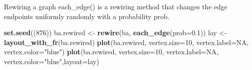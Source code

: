 \documentclass[]{article}
\newenvironment{Shaded}{\begin{snugshade}}{\end{snugshade}}
\newcommand{\DataTypeTok}[1]{\textcolor[rgb]{0.13,0.29,0.53}{#1}}
\newcommand{\DecValTok}[1]{\textcolor[rgb]{0.00,0.00,0.81}{#1}}
\newcommand{\FloatTok}[1]{\textcolor[rgb]{0.00,0.00,0.81}{#1}}
\newcommand{\KeywordTok}[1]{\textcolor[rgb]{0.13,0.29,0.53}{\textbf{#1}}}
\newcommand{\NormalTok}[1]{#1}
\newcommand{\OtherTok}[1]{\textcolor[rgb]{0.56,0.35,0.01}{#1}}
\newcommand{\StringTok}[1]{\textcolor[rgb]{0.31,0.60,0.02}{#1}}
\begin{document}
Rewiring a graph each\_edge() is a rewiring method that changes the edge
endpoints uniformly randomly with a probability prob.

\begin{Shaded}
\begin{Highlighting}[]
\KeywordTok{set.seed}\NormalTok{((}\DecValTok{876}\NormalTok{))}
\NormalTok{ba.rewired <-}\StringTok{ }\KeywordTok{rewire}\NormalTok{(ba, }\KeywordTok{each_edge}\NormalTok{(}\DataTypeTok{prob=}\FloatTok{0.1}\NormalTok{))}
\NormalTok{lay <-}\StringTok{ }\KeywordTok{layout_with_fr}\NormalTok{(ba.rewired)}
\KeywordTok{plot}\NormalTok{(ba.rewired, }\DataTypeTok{vertex.size=}\DecValTok{10}\NormalTok{, }\DataTypeTok{vertex.label=}\OtherTok{NA}\NormalTok{, }\DataTypeTok{vertex.color=}\StringTok{"blue"}\NormalTok{)}
\KeywordTok{plot}\NormalTok{(ba.rewired, }\DataTypeTok{vertex.size=}\DecValTok{10}\NormalTok{, }\DataTypeTok{vertex.label=}\OtherTok{NA}\NormalTok{, }\DataTypeTok{vertex.color=}\StringTok{"blue"}\NormalTok{,}\DataTypeTok{layout=}\NormalTok{lay)}
\end{Highlighting}
\end{Shaded}
\end{document}

